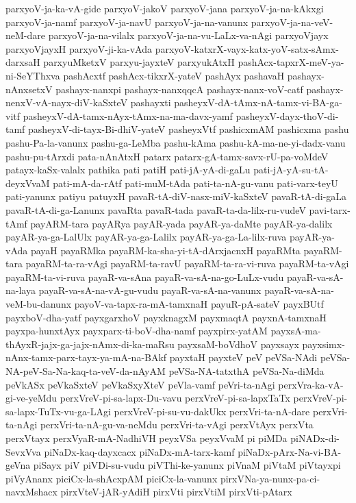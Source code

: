 {parxyoV-ja-ka-vA-gide
parxyoV-jakoV
parxyoV-jana
parxyoV-ja-na-kAkxgi
parxyoV-ja-namf
parxyoV-ja-navU
parxyoV-ja-na-vanunx
parxyoV-ja-na-veV-neM-dare
parxyoV-ja-na-vilalx
parxyoV-ja-na-vu-LaLx-va-nAgi
parxyoVjayx
parxyoVjayxH
parxyoV-ji-ka-vAda
parxyoV-katxrX-vayx-katx-yoV-satx-sAmx-darxsaH
parxyuMketxV
parxyu-jayxteV
parxyukAtxH
pashAcx-tapxrX-meV-ya-ni-SeYThxva
pashAcxtf
pashAcx-tikxrX-yateV
pashAyx
pashavaH
pashayx-nAnxsetxV
pashayx-nanxpi
pashayx-nanxqqcA
pashayx-nanx-voV-catf
pashayx-nenxV-vA-nayx-diV-kaSxteV
pashayxti
pasheyxV-dA-tAmx-nA-tamx-vi-BA-ga-vitf
pasheyxV-dA-tamx-nAyx-tAmx-na-ma-davx-yamf
pasheyxV-dayx-thoV-di-tamf
pasheyxV-di-tayx-Bi-dhiV-yateV
pasheyxVtf
pashicxmAM
pashicxma
pashu
pashu-Pa-la-vanunx
pashu-ga-LeMba
pashu-kAma
pashu-kA-ma-ne-yi-dadx-vanu
pashu-pu-tArxdi
pata-nAnAtxH
patarx
patarx-gA-tamx-savx-rU-pa-voMdeV
patayx-kaSx-valalx
pathika
pati
patiH
pati-jA-yA-di-gaLu
pati-jA-yA-su-tA-deyxVvaM
pati-mA-da-rAtf
pati-muM-tAda
pati-ta-nA-gu-vanu
pati-varx-teyU
pati-yanunx
patiyu
patuyxH
pavaR-tA-diV-nasx-miV-kaSxteV
pavaR-tA-di-gaLa
pavaR-tA-di-ga-Lanunx
pavaRta
pavaR-tada
pavaR-ta-da-lilx-ru-vudeV
pavi-tarx-tAmf
payARM-tara
payARya
payAR-yada
payAR-ya-daMte
payAR-ya-dalilx
payAR-ya-ga-LalUlx
payAR-ya-ga-Lalilx
payAR-ya-ga-La-lilx-ruva
payAR-ya-vAda
payaH
payaRMka
payaRM-ka-sha-yi-tA-dArxjacnxH
payaRMta
payaRM-tara
payaRM-ta-ra-vAgi
payaRM-ta-ravU
payaRM-ta-ra-vi-ruva
payaRM-ta-vAgi
payaRM-ta-vi-ruva
payaR-va-sAna
payaR-va-sA-na-go-LuLx-vudu
payaR-va-sA-na-laya
payaR-va-sA-na-vA-gu-vudu
payaR-va-sA-na-vanunx
payaR-va-sA-na-veM-bu-danunx
payoV-va-tapx-ra-mA-tamxnaH
payuR-pA-sateV
payxBUtf
payxboV-dha-yatf
payxgarxhoV
payxknagxM
payxmaqtA
payxnA-tamxnaH
payxpa-hunxtAyx
payxparx-ti-boV-dha-namf
payxpirx-yatAM
payxsA-ma-thAyxR-jajx-ga-jajx-nAmx-di-ka-maRsu
payxsaM-boVdhoV
payxsayx
payxsimx-nAnx-tamx-parx-tayx-ya-mA-na-BAkf
payxtaH
payxteV
peV
peVSa-NAdi
peVSa-NA-peV-Sa-Na-kaq-ta-veV-da-nAyAM
peVSa-NA-tatxthA
peVSa-Na-diMda
peVkASx
peVkaSxteV
peVkaSxyXteV
peVla-vamf
peVri-ta-nAgi
perxVra-ka-vA-gi-ve-yeMdu
perxVreV-pi-sa-lapx-Du-vavu
perxVreV-pi-sa-lapxTaTx
perxVreV-pi-sa-lapx-TuTx-vu-ga-LAgi
perxVreV-pi-su-vu-dakUkx
perxVri-ta-nA-dare
perxVri-ta-nAgi
perxVri-ta-nA-gu-va-neMdu
perxVri-ta-vAgi
perxVtAyx
perxVta
perxVtayx
perxVyaR-mA-NadhiVH
peyxVSa
peyxVvaM
pi
piMDa
piNADx-di-SevxVva
piNaDx-kaq-dayxcacx
piNaDx-mA-tarx-kamf
piNaDx-pArx-Na-vi-BA-geVna
piSayx
piV
piVDi-su-vudu
piVThi-ke-yanunx
piVnaM
piVtaM
piVtayxpi
piVyAnanx
piciCx-la-shAcxpAM
piciCx-la-vanunx
pirxVNa-ya-nunx-pa-ci-navxMshacx
pirxVteV-jAR-yAdiH
pirxVti
pirxVtiM
pirxVti-pAtarx
}
